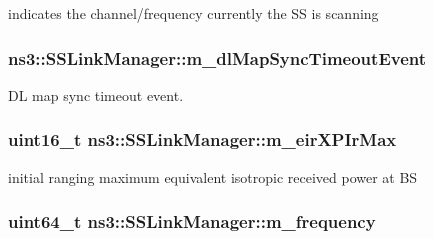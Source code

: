 indicates the channel/frequency currently the SS is scanning 

\subsubsection[{\texorpdfstring{m\+\_\+dl\+Map\+Sync\+Timeout\+Event}{m_dlMapSyncTimeoutEvent}}]{ ns3\+::\+S\+S\+Link\+Manager\+::m\+\_\+dl\+Map\+Sync\+Timeout\+Event\hspace{0.3cm}{\ttfamily [private]}}\hypertarget{classns3_1_1SSLinkManager_a28189a9eb7f8a42e106b8929992a9f7a}{}\label{classns3_1_1SSLinkManager_a28189a9eb7f8a42e106b8929992a9f7a}


DL map sync timeout event. 

\subsubsection[{\texorpdfstring{m\+\_\+eir\+X\+P\+Ir\+Max}{m_eirXPIrMax}}]{\setlength{\rightskip}{0pt plus 5cm}uint16\+\_\+t ns3\+::\+S\+S\+Link\+Manager\+::m\+\_\+eir\+X\+P\+Ir\+Max\hspace{0.3cm}{\ttfamily [private]}}\hypertarget{classns3_1_1SSLinkManager_a6f1082234c10d469aaf83975e851f5a3}{}\label{classns3_1_1SSLinkManager_a6f1082234c10d469aaf83975e851f5a3}


initial ranging maximum equivalent isotropic received power at BS 

\subsubsection[{\texorpdfstring{m\+\_\+frequency}{m_frequency}}]{\setlength{\rightskip}{0pt plus 5cm}uint64\+\_\+t ns3\+::\+S\+S\+Link\+Manager\+::m\+\_\+frequency\hspace{0.3cm}{\ttfamily [private]}}\hypertarget{classns3_1_1SSLinkManager_a7b09219cd63013f994d264cf0dcaa485}{}\label{classns3_1_1SSLinkManager_a7b09219cd63013f994d264cf0dcaa485}


